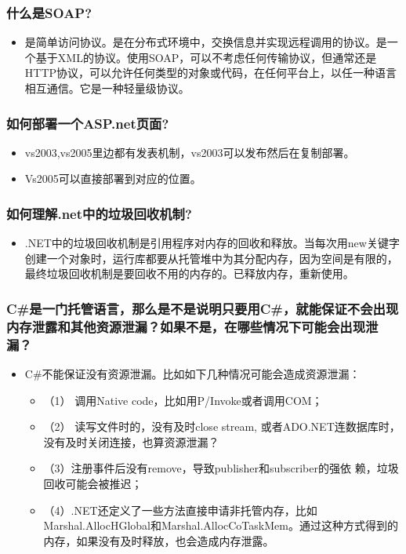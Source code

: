 \documentclass[9pt, b5paper]{article}
\begin{document}
\subsubsection{什么是SOAP?}
\label{sec-1-2-86}
\begin{itemize}
\item 是简单访问协议。是在分布式环境中，交换信息并实现远程调用的协议。是一个基于XML的协议。使用SOAP，可以不考虑任何传输协议，但通常还是HTTP协议，可以允许任何类型的对象或代码，在任何平台上，以任一种语言相互通信。它是一种轻量级协议。
\end{itemize}
\subsubsection{如何部署一个ASP.net页面?}
\label{sec-1-2-87}
\begin{itemize}
\item vs2003,vs2005里边都有发表机制，vs2003可以发布然后在复制部署。
\item Vs2005可以直接部署到对应的位置。
\end{itemize}
\subsubsection{如何理解.net中的垃圾回收机制?}
\label{sec-1-2-88}
\begin{itemize}
\item .NET中的垃圾回收机制是引用程序对内存的回收和释放。当每次用new关键字创建一个对象时，运行库都要从托管堆中为其分配内存，因为空间是有限的，最终垃圾回收机制是要回收不用的内存的。已释放内存，重新使用。
\end{itemize}
\subsubsection{C\#是一门托管语言，那么是不是说明只要用C\#，就能保证不会出现内存泄露和其他资源泄漏？如果不是，在哪些情况下可能会出现泄漏？}
\label{sec-1-2-89}
\begin{itemize}
\item C\#不能保证没有资源泄漏。比如如下几种情况可能会造成资源泄漏：
\begin{itemize}
\item （1） 调用Native code，比如用P/Invoke或者调用COM；
\item （2） 读写文件时的，没有及时close stream, 或者ADO.NET连数据库时，没有及时关闭连接，也算资源泄漏？
\item （3）注册事件后没有remove，导致publisher和subscriber的强依 赖，垃圾回收可能会被推迟；
\item （4）.NET还定义了一些方法直接申请非托管内存，比如Marshal.AllocHGlobal和Marshal.AllocCoTaskMem。通过这种方式得到的内存，如果没有及时释放，也会造成内存泄露。
\end{itemize}
\end{itemize}
\end{document}
